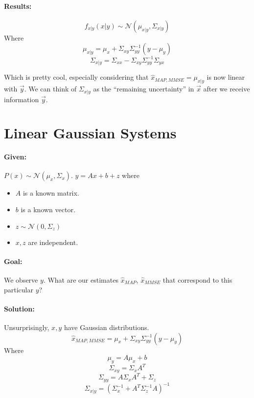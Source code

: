 \documentclass[a4paper,12pt]{report}
\begin{document}
\paragraph{Results: } 

\begin{equation}
f_{x|y}(x|y) \sim \mathcal N(\mu_{x|y}, \Sigma_{x|y})
\end{equation}
Where 
\begin{equation}
\mu_{x|y} = \mu_x + \Sigma_{xy} \Sigma_{yy}^{-1} (y-\mu_y)
\end{equation}
\begin{equation}
\Sigma_{x|y} = \Sigma_{xx} - \Sigma_{xy}\Sigma^{-1}_{yy}\Sigma_{yx}
\end{equation}

Which is pretty cool, especially considering that $\hat x_{MAP, MMSE} = \mu_{x|y}$ is now linear with $\vec y$. We can think of $\Sigma_{x|y}$ as the ``remaining uncertainty'' in $\vec x$ after we receive information $\vec y$. 


\section{Linear Gaussian Systems}

\paragraph{Given: } $P(x) \sim \mathcal N(\mu_x, \Sigma_x)$. $y = Ax+b+z$ where
\begin{itemize}
\item $A$ is a known matrix.
\item $b$ is a known vector.
\item $z\sim \mathcal N(0, \Sigma_z)$
\item $x,z$ are independent.
\end{itemize}

\paragraph{Goal: } We observe $y$. What are our estimates $\hat x_{MAP}$, $\hat x_{MMSE}$ that correspond to this particular $y$?

\paragraph{Solution: } Unsurprisingly, $x,y$ have Gaussian distributions.
\begin{equation}
\hat x_{MAP, MMSE} = \mu_x + \Sigma_{xy}\Sigma_{yy}^{-1}(y-\mu_y)
\end{equation}
Where
\begin{equation}
\mu_y = A\mu_x + b
\end{equation}
\begin{equation}
\Sigma_{xy} = \Sigma_x A^T
\end{equation}
\begin{equation}
\Sigma_{yy} = A\Sigma_xA^T + \Sigma_z
\end{equation}
\begin{equation}
\Sigma_{x|y} = (\Sigma_x^{-1} + A^T\Sigma_z^{-1}A)^{-1}
\end{equation}
\end{document}
